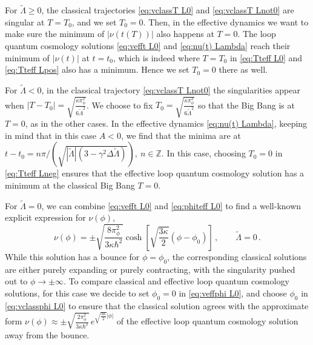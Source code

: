 \documentclass[aps,prd,11pt,showkeys,nofootinbib]{revtex4-2}
\begin{document}
For $\tilde\Lambda \geq 0$, the classical trajectories \eqref{eq:vclassT L0} and \eqref{eq:vclassT Lnot0} are singular at $T=T_0$, and we set $T_0=0$. Then, in the effective dynamics we want to make sure the minimum of $|\nu(t(T))|$ also happens at $T=0$. The loop quantum cosmology solutions \eqref{eq:vefft L0} and \eqref{eq:nu(t) Lambda} reach their minimum of $|\nu(t)|$ at $t=t_0$, which is indeed where $T=T_0$ in \eqref{eq:Tteff L0} and \eqref{eq:Tteff Lpos} also has a minimum. Hence we set $T_0=0$ there as well.

For $\tilde\Lambda <0$, in the classical trajectory \eqref{eq:vclassT Lnot0} the singularities appear when $|T-T_0| =  \sqrt{\frac{\kappa\pi_\phi^2}{6\tilde\Lambda^2}}$. We choose to fix $T_0= \sqrt{\frac{\kappa\pi_\phi^2}{6\tilde\Lambda^2}}$ so that the Big Bang is at $T=0$, as in the other cases. In the effective dynamics \eqref{eq:nu(t) Lambda}, keeping in mind that in this case $A<0$, we find that the minima are at $t-t_0=n\pi/(\sqrt{|\tilde{\Lambda}|(3-\gamma^2\Delta\tilde{\Lambda})}),\ n\in \mathbb{Z}$. In this case, choosing $T_0=0$ in \eqref{eq:Tteff Lneg} ensures that the effective loop quantum cosmology solution has a minimum at the classical Big Bang $T=0$.

For $\tilde\Lambda = 0$, we can combine \eqref{eq:vefft L0} and \eqref{eq:phiteff L0} to find a well-known explicit expression for $\nu(\phi)$,
\begin{equation}
\nu(\phi) = \pm\sqrt{\frac{8\pi_\phi^2}{3\kappa\hbar^2}}\cosh\left[\sqrt{\frac{3\kappa}{2}}(\phi-\phi_0)\right]\,,\qquad \tilde{\Lambda}=0\,.\label{eq:veffphi L0}
\end{equation}
While this solution has a bounce for $\phi=\phi_0$, the corresponding classical solutions are either purely expanding or purely contracting, with the singularity pushed out to $\phi\rightarrow\pm\infty$. To compare classical and effective loop quantum cosmology solutions, for this case we decide to set $\phi_0=0$ in \eqref{eq:veffphi L0}, and choose $\phi_0$ in \eqref{eq:vclassphi L0} to ensure that the classical solution agrees with the approximate form $\nu(\phi)\approx \pm\sqrt{\frac{2\pi_\phi^2}{3\kappa\hbar^2}}\,e^{\sqrt{\frac{3\kappa}{2}}|\phi|}$ of the effective loop quantum cosmology solution away from the bounce.
\end{document}
